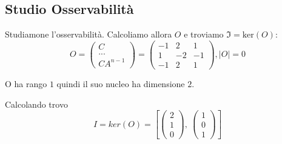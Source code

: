 \documentclass{article}
\begin{document}
\subsection{Studio Osservabilità}

Studiamone l'osservabilità. Calcoliamo allora $O$ e troviamo $\mathfrak{I} = \text{ker}(O)$:
\[
 O = \begin{pmatrix}C \\ ... \\ CA^{n-1}  \end{pmatrix} = \left(\begin{matrix}-1 & 2 & 1\\1 & -2 & -1\\-1 & 2 & 1\end{matrix}\right), |O| = 0 \]

O ha rango $ 1 $ quindi il suo nucleo ha dimensione $ 2 $.

Calcolando trovo \[ 
I = ker(O) = \left[ \left(\begin{matrix}2\\1\\0\end{matrix}\right), \  \left(\begin{matrix}1\\0\\1\end{matrix}\right)\right]\]
\end{document}
